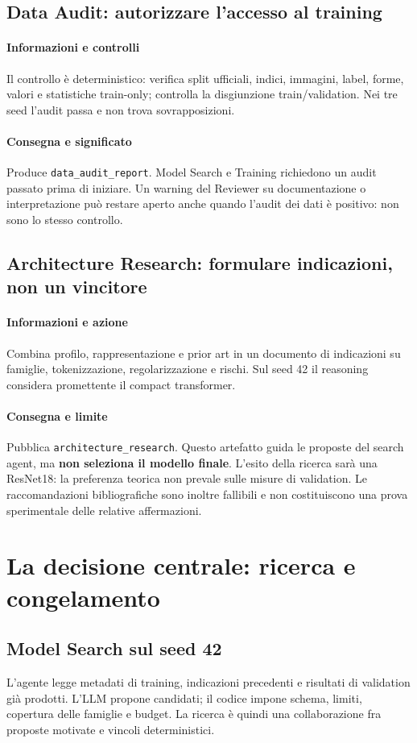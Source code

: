 \documentclass[11pt,a4paper]{article}
\newcommand{\artefatto}[1]{\nolinkurl{#1}}
\newcommand{\ruolo}[1]{\paragraph{#1}}
\begin{document}
\subsection{Data Audit: autorizzare l'accesso al training}
\ruolo{Informazioni e controlli}
Il controllo è deterministico: verifica split ufficiali, indici, immagini,
label, forme, valori e statistiche train-only; controlla la disgiunzione
train/validation. Nei tre seed l'audit passa e non trova sovrapposizioni.

\ruolo{Consegna e significato}
Produce \artefatto{data_audit_report}. Model Search e Training richiedono
un audit passato prima di iniziare. Un warning del Reviewer su documentazione
o interpretazione può restare aperto anche quando l'audit dei dati è positivo:
non sono lo stesso controllo.

\subsection{Architecture Research: formulare indicazioni, non un vincitore}
\ruolo{Informazioni e azione}
Combina profilo, rappresentazione e prior art in un documento di indicazioni
su famiglie, tokenizzazione, regolarizzazione e rischi. Sul seed 42 il
reasoning considera promettente il compact transformer.

\ruolo{Consegna e limite}
Pubblica \artefatto{architecture_research}. Questo artefatto guida le proposte
del search agent, ma \textbf{non seleziona il modello finale}. L'esito della
ricerca sarà una ResNet18: la preferenza teorica non prevale sulle misure
di validation. Le raccomandazioni bibliografiche sono inoltre fallibili e
non costituiscono una prova sperimentale delle relative affermazioni.

\section{La decisione centrale: ricerca e congelamento}

\subsection{Model Search sul seed 42}
L'agente legge metadati di training, indicazioni precedenti e risultati
di validation già prodotti. L'LLM propone candidati; il codice impone
schema, limiti, copertura delle famiglie e budget. La ricerca è quindi
una collaborazione fra proposte motivate e vincoli deterministici.
\end{document}
